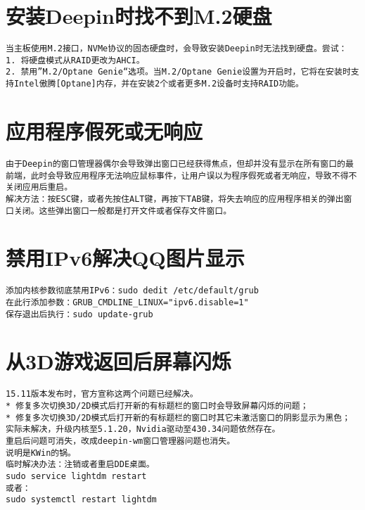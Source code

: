 \documentclass[a4paper,fontset=fandol,zihao=-4,linespread=1.2,oneside]{ctexbook}
\begin{document}
\section{安装Deepin时找不到M.2硬盘}
\begin{lstlisting}
当主板使用M.2接口，NVMe协议的固态硬盘时，会导致安装Deepin时无法找到硬盘。尝试：
1. 将硬盘模式从RAID更改为AHCI。
2. 禁用”M.2/Optane Genie“选项。当M.2/Optane Genie设置为开启时，它将在安装时支持Intel傲腾[Optane]内存，并在安装2个或者更多M.2设备时支持RAID功能。
\end{lstlisting}

\section{应用程序假死或无响应}
\begin{lstlisting}
由于Deepin的窗口管理器偶尔会导致弹出窗口已经获得焦点，但却并没有显示在所有窗口的最前端，此时会导致应用程序无法响应鼠标事件，让用户误以为程序假死或者无响应，导致不得不关闭应用后重启。
解决方法：按ESC键，或者先按住ALT键，再按下TAB键，将失去响应的应用程序相关的弹出窗口关闭。这些弹出窗口一般都是打开文件或者保存文件窗口。
\end{lstlisting}

\section{禁用IPv6解决QQ图片显示}
\begin{lstlisting}
添加内核参数彻底禁用IPv6：sudo dedit /etc/default/grub
在此行添加参数：GRUB_CMDLINE_LINUX="ipv6.disable=1"
保存退出后执行：sudo update-grub
\end{lstlisting}

\section{从3D游戏返回后屏幕闪烁}
\begin{lstlisting}
15.11版本发布时，官方宣称这两个问题已经解决。
* 修复多次切换3D/2D模式后打开新的有标题栏的窗口时会导致屏幕闪烁的问题；
* 修复多次切换3D/2D模式后打开新的有标题栏的窗口时其它未激活窗口的阴影显示为黑色；
实际未解决，升级内核至5.1.20，Nvidia驱动至430.34问题依然存在。
重启后问题可消失，改成deepin-wm窗口管理器问题也消失。
说明是KWin的锅。
临时解决办法：注销或者重启DDE桌面。
sudo service lightdm restart
或者：
sudo systemctl restart lightdm
\end{lstlisting}
\end{document}
